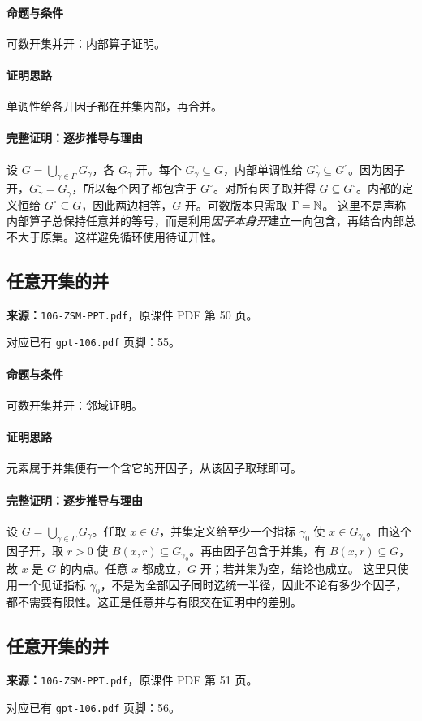\paragraph{命题与条件}可数开集并开：内部算子证明。
\paragraph{证明思路}单调性给各开因子都在并集内部，再合并。
\paragraph{完整证明：逐步推导与理由}
设 $G=\bigcup_{\gamma\in\Gamma}G_\gamma$，各 $G_\gamma$ 开。每个 $G_\gamma\subseteq G$，内部单调性给 $G_\gamma^\circ\subseteq G^\circ$。因为因子开，$G_\gamma^\circ=G_\gamma$，所以每个因子都包含于 $G^\circ$。对所有因子取并得 $G\subseteq G^\circ$。内部的定义恒给 $G^\circ\subseteq G$，因此两边相等，$G$ 开。可数版本只需取 $\Gamma=\mathbb{N}$。
这里不是声称内部算子总保持任意并的等号，而是利用\emph{因子本身开}建立一向包含，再结合内部总不大于原集。这样避免循环使用待证开性。
\clearpage\subsection{任意开集的并}
\textbf{来源：}\texttt{106-ZSM-PPT.pdf}，原课件 PDF 第 50 页。\par
对应已有 \texttt{gpt-106.pdf} 页脚：55。\par
\paragraph{命题与条件}可数开集并开：邻域证明。
\paragraph{证明思路}元素属于并集便有一个含它的开因子，从该因子取球即可。
\paragraph{完整证明：逐步推导与理由}
设 $G=\bigcup_{\gamma\in\Gamma}G_\gamma$。任取 $x\in G$，并集定义给至少一个指标 $\gamma_0$ 使 $x\in G_{\gamma_0}$。由这个因子开，取 $r>0$ 使 $B(x,r)\subseteq G_{\gamma_0}$。再由因子包含于并集，有 $B(x,r)\subseteq G$，故 $x$ 是 $G$ 的内点。任意 $x$ 都成立，$G$ 开；若并集为空，结论也成立。
这里只使用一个见证指标 $\gamma_0$，不是为全部因子同时选统一半径，因此不论有多少个因子，都不需要有限性。这正是任意并与有限交在证明中的差别。
\clearpage\subsection{任意开集的并}
\textbf{来源：}\texttt{106-ZSM-PPT.pdf}，原课件 PDF 第 51 页。\par
对应已有 \texttt{gpt-106.pdf} 页脚：56。\par
